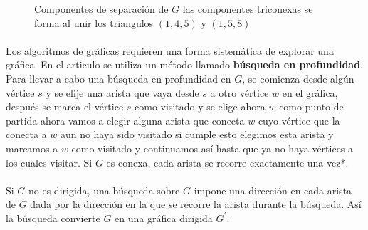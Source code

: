\begin{figure}[H]
\begin{subfigure}[b]{0.5\textwidth}
\begin{minipage}{7cm}
\begin{tikzpicture}[scale=.4]
            \end{tikzpicture}
       \end{minipage}
      \end{subfigure}
      \begin{subfigure}[b]{0.5\textwidth}
       \begin{minipage}{7cm}
            \centering%
       \end{minipage}
      \end{subfigure}
\caption{Componentes de separación de $G$ las componentes triconexas se forma al unir los triangulos $(1, 4, 5)$ y $(1, 5, 8)$}
\label{figura:3.2}
\end{figure}

\paragraph{}
Los algoritmos de gráficas requieren una forma sistemática de explorar una gráfica. En el articulo \citep{hopcroft1973} se utiliza un método llamado \textbf{búsqueda en profundidad}. Para llevar a cabo una búsqueda en profundidad en $G$, se comienza desde algún vértice $s$ y se elije una arista que vaya desde $s$ a otro vértice $w$ en el gráfica, después se marca el vértice $s$ como visitado y se elige ahora $w$ como punto de partida ahora vamos a elegir alguna arista que conecta $w$ cuyo vértice que la conecta a $w$ aun no haya sido visitado si cumple esto elegimos esta arista y marcamos a $w$ como visitado y continuamos así hasta que ya no haya vértices a los cuales visitar. Si $G$ es conexa, cada arista se recorre exactamente una vez*.

\paragraph{}
Si $G$ no es dirigida, una búsqueda sobre $G$ impone una dirección en cada arista de $G$ dada por la dirección en la que se recorre la arista durante la búsqueda. Así la búsqueda convierte $G$ en una gráfica dirigida $G^{'}$.

